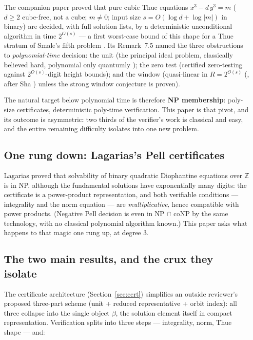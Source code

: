 \documentclass[11pt]{amsart}
\theoremstyle{plain}
\theoremstyle{remark}
\begin{document}
The companion paper \cite{companion} proved that pure cubic Thue
equations $x^3 - d\,y^3 = m$ ($d \ge 2$ cube-free, not a cube;
$m \ne 0$; input size $s = O(\log d + \log|m|)$ in binary) are
decided, with full solution lists, by a deterministic unconditional
algorithm in time $2^{O(s)}$ --- a first worst-case bound of this
shape for a Thue stratum of Smale's fifth problem \cite{Sma98}. Its
Remark~7.5 named the three obstructions to \emph{polynomial-time}
decision: the unit (the principal ideal problem, classically believed
hard, polynomial only quantumly \cite{Hal07}); the zero test
(certified zero-testing against $2^{O(s)}$-digit height bounds); and
the window (quasi-linear in $R = 2^{\Theta(s)}$
(\cite[Lemma~C]{companion}, after Sha \cite{Sha19}) unless the strong
window conjecture is proven).

The natural target below polynomial time is therefore \textbf{NP
membership}: poly-size certificates, deterministic poly-time
verification. This paper is that pivot, and its outcome is
asymmetric: two thirds of the verifier's work is classical and easy,
and the entire remaining difficulty isolates into one new problem.

\subsection{One rung down: Lagarias's Pell certificates}
\label{sec:lagarias}

Lagarias \cite{Lag79} proved that solvability of binary quadratic
Diophantine equations over $\mathbb{Z}$ is in NP, although the
fundamental solutions have exponentially many digits: the certificate
is a power-product representation, and both verifiable conditions ---
integrality and the norm equation --- are \emph{multiplicative},
hence compatible with power products. (Negative Pell decision is even
in NP $\cap$ coNP by the same technology, with no classical
polynomial algorithm known.) This paper asks what happens to that
magic one rung up, at degree 3.

\subsection{The two main results, and the crux they isolate}
\label{sec:results}

The certificate architecture (Section~\ref{sec:cert}) simplifies an
outside reviewer's proposed three-part scheme (unit + reduced
representative + orbit index): all three collapse into the single
object $\beta$, the solution element itself in compact
representation. Verification splits into three steps --- integrality,
norm, Thue shape --- and:
\end{document}
